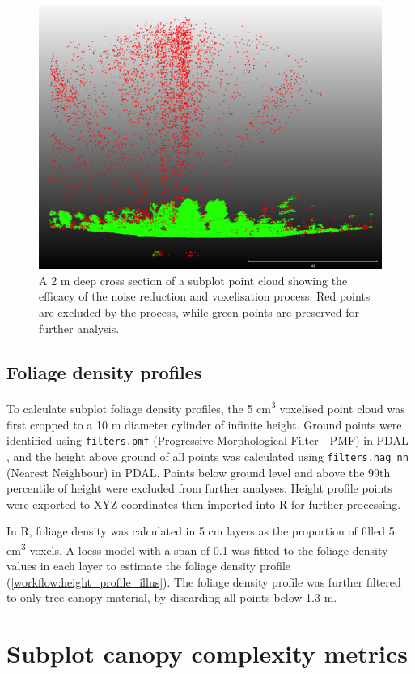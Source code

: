 \begin{refsection}
\begin{figure}
\centering
	\includegraphics[width=0.7\linewidth]{img/noise_vis}
	\caption[Visualisation of noise reduction algorithm]{A 2 m deep cross section of a subplot point cloud showing the efficacy of the noise reduction and voxelisation process. Red points are excluded by the process, while green points are preserved for further analysis.}
	\label{workflow:noise_vis}
\end{figure}

\subsection{Foliage density profiles}

To calculate subplot foliage density profiles, the 5 cm\textsuperscript{3} voxelised point cloud was first cropped to a 10 m diameter cylinder of infinite height. Ground points were identified using \texttt{filters.pmf} (Progressive Morphological Filter - PMF) in PDAL \citep{Zhang2003}, and the height above ground of all points was calculated using \texttt{filters.hag\_nn} (Nearest Neighbour) in PDAL. Points below ground level and above the 99th percentile of height were excluded from further analyses. Height profile points were exported to XYZ coordinates then imported into R for further processing. 

In R, foliage density was calculated in 5 cm layers as the proportion of filled 5 cm\textsuperscript{3} voxels. A loess model with a span of 0.1 was fitted to the foliage density values in each layer to estimate the foliage density profile (\autoref{workflow:height_profile_illus}). The foliage density profile was further filtered to only tree canopy material, by discarding all points below 1.3 m.

\section{Subplot canopy complexity metrics}


\end{refsection}

